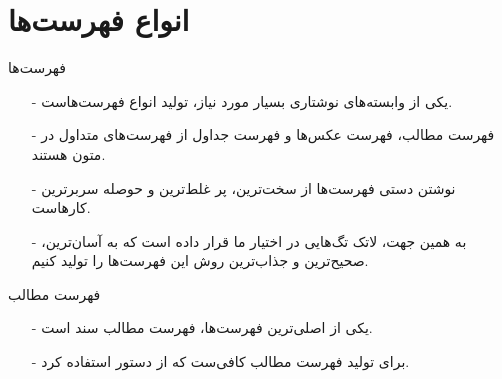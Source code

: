 \section{انواع فهرست‌ها}
\begin{frame}{فهرست‌ها}
\begin{itemize}\itemr
\item[-]
یکی از وابسته‌های نوشتاری بسیار مورد نیاز، تولید انواع فهرست‌هاست.

\item[-]
فهرست مطالب، فهرست عکس‌ها و فهرست جداول از فهرست‌های متداول در متون هستند.

\item[-]
نوشتن دستی فهرست‌ها از سخت‌ترین، پر غلط‌ترین و حوصله‌ سربرترین کار‌هاست.

\item[-]
به همین جهت، لاتک تگ‌هایی در اختیار ما قرار داده است که به آسان‌ترین، صحیح‌ترین و جذاب‌ترین روش این فهرست‌ها را تولید کنیم.
\end{itemize}
\end{frame}

\begin{frame}{فهرست مطالب}
\begin{itemize}\itemr
\item[-]
یکی از اصلی‌ترین فهرست‌ها، فهرست مطالب سند است.

\item[-]
برای تولید فهرست مطالب کافی‌ست که از دستور 
استفاده کرد.
\end{itemize}
\end{frame}

